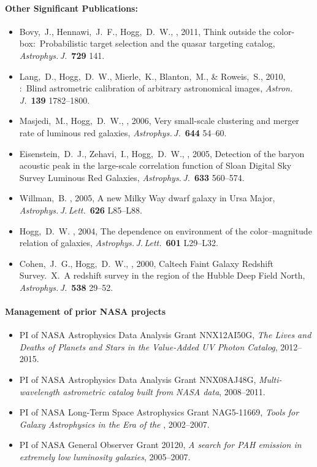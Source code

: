 \documentclass[letterpaper,12pt]{article}
\begin{document}
\paragraph{Other Significant Publications:}
\begin{itemize}\setlength{\itemsep}{0pt}
\item
Bovy,~J., Hennawi,~J.~F., Hogg,~D.~W., \etal, 2011,
Think outside the color-box:\ Probabilistic target selection and
the  quasar targeting catalog,
\textit{Astrophys.\,J.}\ \textbf{729} 141.
\item
Lang,~D., Hogg,~D.~W., Mierle,~K., Blanton,~M., \& Roweis,~S., 2010,
{:\ Blind astrometric calibration of arbitrary astronomical images},
\textit{Astron.\,J.}\ \textbf{139} 1782--1800.
\item\label{pub:Masjedi2006}
Masjedi,~M., Hogg,~D.~W., \etal, 2006,
{Very small-scale clustering and merger rate of luminous red galaxies},
\textit{Astrophys.\,J.}\ \textbf{644} 54--60.
\item
Eisenstein,~D.~J., Zehavi,~I., Hogg,~D.~W., \etal, 2005,
Detection of the baryon acoustic peak in the large-scale correlation
function of Sloan Digital Sky Survey Luminous Red Galaxies,
\textit{Astrophys.\,J.}\ \textbf{633} 560--574.
\item
Willman,~B. \etal, 2005, A new Milky Way dwarf galaxy in Ursa Major,
\textit{Astrophys.\,J.\,Lett.}\ \textbf{626} L85--L88.
\item
Hogg,~D.~W. \etal, 2004, The dependence on environment of the
color--magnitude relation of galaxies, \textit{Astrophys.\,J.\,Lett.}\ 
\textbf{601} L29--L32.
\item
Cohen,~J.~G., Hogg,~D.~W., \etal, 2000, Caltech Faint
Galaxy Redshift Survey.\ X.\ A redshift survey in the region of the
Hubble Deep Field North, \textit{Astrophys.\,J.}\ \textbf{538} 29--52.
\end{itemize}

\paragraph{Management of prior NASA projects}
\begin{itemize}\setlength{\itemsep}{0pt}
\item
PI of NASA Astrophysics Data Analysis Grant NNX12AI50G,
\textit{The Lives and Deaths of Planets and Stars in the Value-Added UV Photon Catalog},
2012--2015.
\item 
PI of NASA Astrophysics Data Analysis Grant NNX08AJ48G,
\textit{Multi-wavelength astrometric catalog built from NASA data},
2008--2011.
\item
PI of NASA Long-Term Space Astrophysics Grant NAG5-11669,
\textit{Tools for Galaxy Astrophysics in the Era of the
},
2002--2007.
\item
PI of NASA  General Observer Grant
20120, \textit{A search
for PAH emission in extremely low luminosity galaxies},
2005--2007.
\end{itemize}
\end{document}
